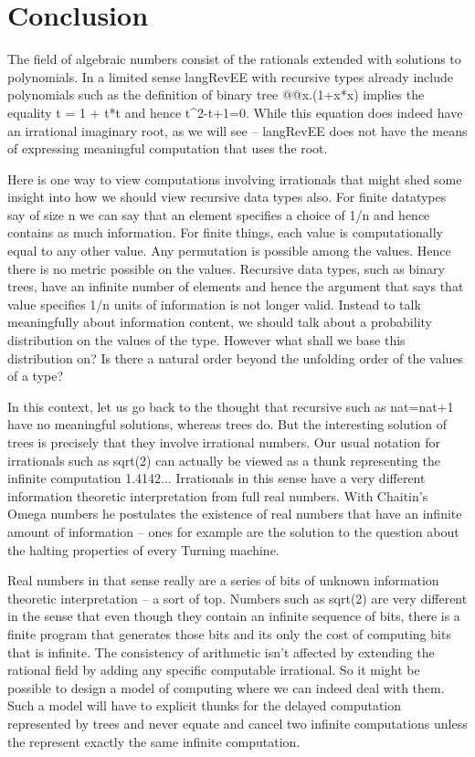 \documentclass[preprint]{sigplanconf}
\begin{document}
\section{Conclusion}
\label{sec:conc}

The field of algebraic numbers consist of the rationals extended with
solutions to polynomials. In a limited sense {{langRevEE}} with
recursive types already include polynomials such as the definition of
binary tree {{@@x.(1+x*x)}} implies the equality {{t = 1 + t*t}} and
hence {{t^2-t+1=0}}. While this equation does indeed have an
irrational imaginary root, as we will see -- {{langRevEE}} does not
have the means of expressing meaningful computation that uses the
root.

Here is one way to view computations involving irrationals that might
shed some insight into how we should view recursive data types
also. For finite datatypes say of size {{n}} we can say that an
element specifies a choice of {{1/n}} and hence contains as much
information. For finite things, each value is computationally equal to
any other value. Any permutation is possible among the values. Hence
there is no metric possible on the values.  Recursive data types, such
as binary trees, have an infinite number of elements and hence the
argument that says that value specifies {{1/n}} units of information
is not longer valid. Instead to talk meaningfully about information
content, we should talk about a probability distribution on the values
of the type. However what shall we base this distribution on? Is there
a natural order beyond the unfolding order of the values of a type? 

In this context, let us go back to the thought that recursive such as
{{nat=nat+1}} have no meaningful solutions, whereas trees do. But the
interesting solution of trees is precisely that they involve
irrational numbers. Our usual notation for irrationals such as
{{sqrt(2) }} can actually be viewed as a thunk representing the
infinite computation {{1.4142..}}. Irrationals in this sense have a
very different information theoretic interpretation from full real
numbers. With Chaitin's Omega numbers he postulates the existence of
real numbers that have an infinite amount of information -- ones for
example are the solution to the question about the halting properties
of every Turning machine. 

Real numbers in that sense really are a series of bits of unknown
information theoretic interpretation -- a sort of {{top}}. Numbers
such as {{sqrt(2) }} are very different in the sense that even though
they contain an infinite sequence of bits, there is a finite program
that generates those bits and its only the cost of computing bits that
is infinite.  The consistency of arithmetic isn't affected by
extending the rational field by adding any specific computable
irrational. So it might be possible to design a model of computing
where we can indeed deal with them. Such a model will have to explicit
thunks for the delayed computation represented by trees and never
equate and cancel two infinite computations unless the represent
exactly the same infinite computation.
\end{document}
